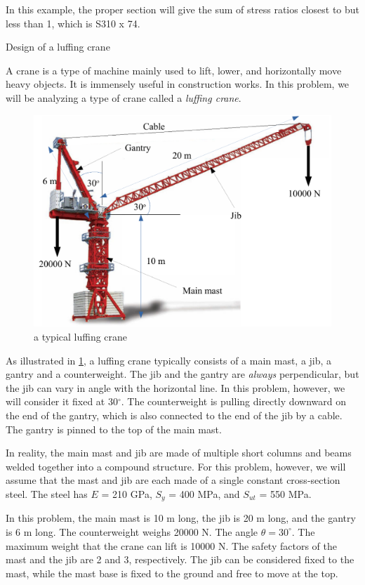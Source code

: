 \documentclass[a4paper,openany,12pt]{book}
\begin{document}
{{\begin{enumerate}
In this example, the proper section will give the sum of stress ratios
closest to but less than 1, which is S310 x 74.

Design of a luffing crane

A crane is a type of machine mainly used to lift, lower, and
horizontally move heavy objects. It is immensely useful in construction
works. In this problem, we will be analyzing a type of crane called a
\emph{luffing crane}.


\begin{figure}[htbp]
\centering
\includegraphics[width=.9\linewidth]{pictures/Simple-load-bearing/tower-crane2.pdf}
\caption{\label{tower crane}a typical luffing crane}
\end{figure}

As illustrated in \ref{tower crane}, a luffing crane
typically consists of a main mast, a jib, a gantry and a counterweight.
The jib and the gantry are \emph{always} perpendicular, but the jib can vary
in angle with the horizontal line. In this problem, however, we will
consider it fixed at 30\(^{\circ}\). The counterweight is pulling directly
downward on the end of the gantry, which is also connected to the end of
the jib by a cable. The gantry is pinned to the top of the main mast.

In reality, the main mast and jib are made of multiple short columns and
beams welded together into a compound structure. For this problem,
however, we will assume that the mast and jib are each made of a single
constant cross-section steel. The steel has \(E\) = 210 GPa, \(S_y\) = 400
MPa, and \(S_{ut}\) = 550 MPa.

In this problem, the main mast is 10 m long, the jib is 20 m long, and
the gantry is 6 m long. The counterweight weighs 20000 N. The angle
\(\theta = 30^{\circ}\). The maximum weight that the crane can lift is
10000 N. The safety factors of the mast and the jib are 2 and 3,
respectively. The jib can be considered fixed to the mast, while the
mast base is fixed to the ground and free to move at the top.


\end{enumerate}}}
\end{document}
